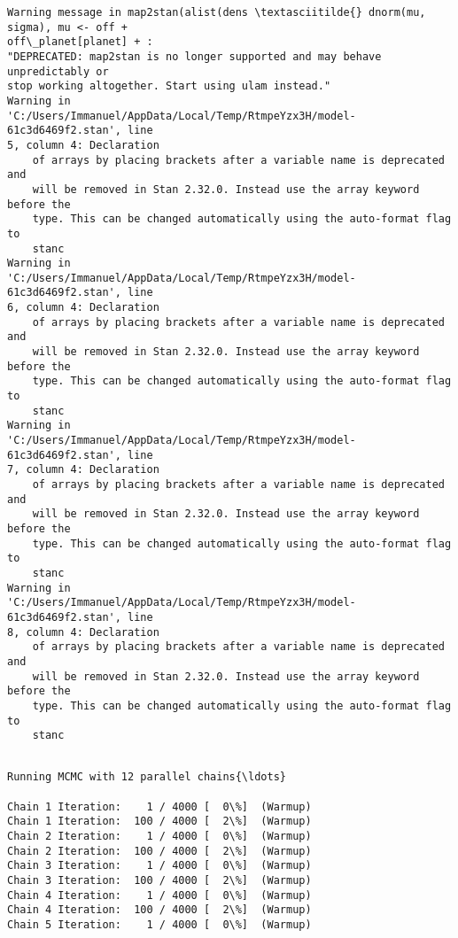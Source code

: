 \documentclass[11pt]{article}
\begin{document}
    \begin{Verbatim}[commandchars=\\\{\}]
Warning message in map2stan(alist(dens \textasciitilde{} dnorm(mu, sigma), mu <- off +
off\_planet[planet] + :
"DEPRECATED: map2stan is no longer supported and may behave unpredictably or
stop working altogether. Start using ulam instead."
Warning in
'C:/Users/Immanuel/AppData/Local/Temp/RtmpeYzx3H/model-61c3d6469f2.stan', line
5, column 4: Declaration
    of arrays by placing brackets after a variable name is deprecated and
    will be removed in Stan 2.32.0. Instead use the array keyword before the
    type. This can be changed automatically using the auto-format flag to
    stanc
Warning in
'C:/Users/Immanuel/AppData/Local/Temp/RtmpeYzx3H/model-61c3d6469f2.stan', line
6, column 4: Declaration
    of arrays by placing brackets after a variable name is deprecated and
    will be removed in Stan 2.32.0. Instead use the array keyword before the
    type. This can be changed automatically using the auto-format flag to
    stanc
Warning in
'C:/Users/Immanuel/AppData/Local/Temp/RtmpeYzx3H/model-61c3d6469f2.stan', line
7, column 4: Declaration
    of arrays by placing brackets after a variable name is deprecated and
    will be removed in Stan 2.32.0. Instead use the array keyword before the
    type. This can be changed automatically using the auto-format flag to
    stanc
Warning in
'C:/Users/Immanuel/AppData/Local/Temp/RtmpeYzx3H/model-61c3d6469f2.stan', line
8, column 4: Declaration
    of arrays by placing brackets after a variable name is deprecated and
    will be removed in Stan 2.32.0. Instead use the array keyword before the
    type. This can be changed automatically using the auto-format flag to
    stanc


    \end{Verbatim}

    \begin{Verbatim}[commandchars=\\\{\}]
Running MCMC with 12 parallel chains{\ldots}

Chain 1 Iteration:    1 / 4000 [  0\%]  (Warmup)
Chain 1 Iteration:  100 / 4000 [  2\%]  (Warmup)
Chain 2 Iteration:    1 / 4000 [  0\%]  (Warmup)
Chain 2 Iteration:  100 / 4000 [  2\%]  (Warmup)
Chain 3 Iteration:    1 / 4000 [  0\%]  (Warmup)
Chain 3 Iteration:  100 / 4000 [  2\%]  (Warmup)
Chain 4 Iteration:    1 / 4000 [  0\%]  (Warmup)
Chain 4 Iteration:  100 / 4000 [  2\%]  (Warmup)
Chain 5 Iteration:    1 / 4000 [  0\%]  (Warmup)
    \end{Verbatim}
\end{document}
